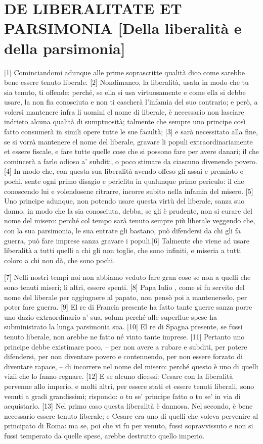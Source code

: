 \quebra\section{DE LIBERALITATE ET PARSIMONIA\break
{[}Della liberalità e della parsimonia{]}}

{[}1{]} Cominciandomi adunque alle prime soprascritte qualità dico come
sarebbe bene essere tenuto liberale. {[}2{]} Nondimanco, la liberalità,
usata in modo che tu sia tenuto, ti offende: perché, se ella si usa
virtuosamente e come ella si debbe usare, la non fia conosciuta e non ti
cascherà l'infamia del suo contrario; e però, a volersi mantenere infra
li uomini el nome di liberale, è necessario non lasciare indrieto alcuna
qualità di sumptuosità; talmente che sempre uno principe così fatto
consumerà in simili opere tutte le sue facultà; {[}3{]} e sarà
necessitato alla fine, se si vorrà mantenere el nome del liberale,
gravare li populi extraordinariamente et essere fiscale, e fare tutte
quelle cose che si possono fare per avere danari; il che comincerà a
farlo odioso a' subditi, o poco stimare da ciascuno divenendo povero.
{[}4{]} In modo che, con questa sua liberalità avendo offeso gli assai e
premiato e pochi, sente ogni primo disagio e periclita in qualunque
primo periculo: il che conoscendo lui e volendosene ritrarre, incorre
subito nella infamia del misero. {[}5{]} Uno principe adunque, non
potendo usare questa virtù del liberale, sanza suo danno, in modo che la
sia conosciuta, debba, se gli è prudente, non si curare del nome del
misero: perché col tempo sarà tenuto sempre più liberale veggendo che,
con la sua parsimonia, le sua entrate gli bastano, può difendersi da chi
gli fa guerra, può fare imprese sanza gravare i populi.{[}6{]} Talmente
che viene ad usare liberalità a tutti quelli a chi gli non toglie, che
sono infiniti, e miseria a tutti coloro a chi non dà, che sono pochi.

{[}7{]} Nelli nostri tempi noi non abbiamo veduto fare gran cose se non
a quelli che sono tenuti miseri; li altri, essere spenti. {[}8{]} Papa
Iulio , come si fu servito del nome del liberale per aggiugnere al
papato, non pensò poi a mantenerselo, per poter fare guerra. {[}9{]} El
re di Francia presente ha fatto tante guerre sanza porre uno dazio
extraordinario a' sua, solum perché alle superflue spese ha
subministrato la lunga parsimonia sua. {[}10{]} El re di Spagna
presente, se fussi tenuto liberale, non arebbe ne fatto né vinto tante
imprese. {[}11{]} Pertanto uno principe debbe existimare poco, -- per
non avere a rubare e subditi, per potere difendersi, per non diventare
povero e contennendo, per non essere forzato di diventare rapace, -- di
incorrere nel nome del misero: perché questo è uno di quelli vizii che
lo fanno regnare. {[}12{]} E se alcuno dicessi: Cesare con la liberalità
pervenne allo imperio, e molti altri, per essere stati et essere tenuti
liberali, sono venuti a gradi grandissimi; rispondo: o tu se' principe
fatto o tu se' in via di acquistarlo. {[}13{]} Nel primo caso questa
liberalità è dannosa. Nel secondo, è bene necessario essere tenuto
liberale; e Cesare era uno di quelli che voleva pervenire al principato
di Roma: ma se, poi che vi fu per venuto, fussi sopravvissuto e non si
fussi temperato da quelle spese, arebbe destrutto quello imperio.

